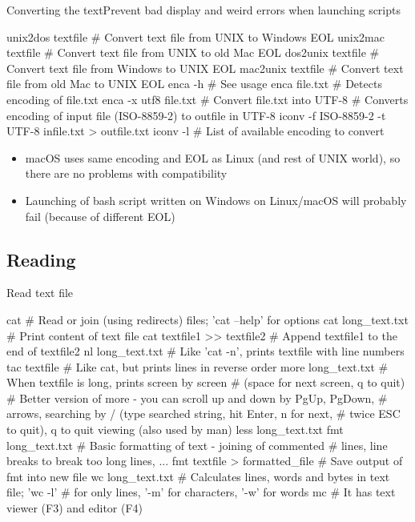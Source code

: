 \documentclass[compress, ucs, xelatex, 11pt, xcolor=svgnames, aspectratio=169,
	hyperref={
		bookmarks=true,
		unicode=true,
		colorlinks=true,
		pdftitle={Linux, command line and MetaCentrum},
		plainpages=false,
		pdfauthor={Vojtech Zeisek},
		pdfsubject={Course about use of Linux command line, writing shell scripts and using MetaCentrum of CESNET},
		pdfcreator={XeLaTeX},
		pdfkeywords={Linux, GNU, BASH, shell, command line, MetaCentrum},
		linkcolor=DarkRed, %
		anchorcolor=DarkBlue, %
		citecolor=Indigo, %
		filecolor=NavyBlue, %
		menucolor=DarkMagenta, %
		urlcolor=DarkBlue, %
		pdftex},
	url={hyphens, lowtilde} %
	]{beamer}
\begin{document}
\begin{frame}[fragile]{Converting the text}{Prevent bad display and weird errors when launching scripts}
	\begin{bashcode}
    unix2dos textfile # Convert text file from UNIX to Windows EOL
    unix2mac textfile # Convert text file from UNIX to old Mac EOL
    dos2unix textfile # Convert text file from Windows to UNIX EOL
    mac2unix textfile # Convert text file from old Mac to UNIX EOL
    enca -h # See usage
    enca file.txt # Detects encoding of file.txt
    enca -x utf8 file.txt # Convert file.txt into UTF-8
    # Converts encoding of input file (ISO-8859-2) to outfile in UTF-8
    iconv -f ISO-8859-2 -t UTF-8 infile.txt > outfile.txt
    iconv -l # List of available encoding to convert
	\end{bashcode}
	\begin{itemize}
		\item macOS uses same encoding and EOL as Linux (and rest of UNIX world), so there are no problems with compatibility
		\item Launching of bash script written on Windows on Linux/macOS will probably fail (because of different EOL)
	\end{itemize}
\end{frame}

\subsection{Reading}

\begin{frame}[fragile]{Read text file}
	\begin{bashcode}
    cat # Read or join (using redirects) files; 'cat --help' for options
    cat long_text.txt # Print content of text file
    cat textfile1 >> textfile2 # Append textfile1 to the end of textfile2
    nl long_text.txt # Like 'cat -n', prints textfile with line numbers
    tac textfile # Like cat, but prints lines in reverse order
    more long_text.txt # When textfile is long, prints screen by screen
                       # (space for next screen, q to quit)
    # Better version of more - you can scroll up and down by PgUp, PgDown,
    # arrows, searching by / (type searched string, hit Enter, n for next,
    # twice ESC to quit), q to quit viewing (also used by man)
    less long_text.txt
    fmt long_text.txt # Basic formatting of text - joining of commented
                      # lines, line breaks to break too long lines, ...
    fmt textfile > formatted_file # Save output of fmt into new file
    wc long_text.txt # Calculates lines, words and bytes in text file; 'wc -l'
                     # for only lines, '-m' for characters, '-w' for words
    mc # It has text viewer (F3) and editor (F4)
	\end{bashcode}
\end{frame}
\end{document}
